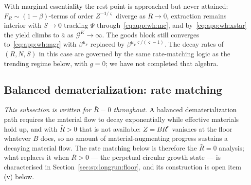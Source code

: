  With marginal essentiality the rest point is approached but never attained: $F_R\sim\left(1-\beta\right)$-terms of order $Z^{-1/\varsigma}$ diverge as $R\to0$, extraction remains interior with $S\to0$ tracking $\Psi$ through~\eqref{eq:app:wh:mc}, and by~\eqref{eq:app:wh:xstar} the yield climbs to $\bar a$ as $\mathcal G^K\to\infty$. The goods block still converges to~\eqref{eq:app:wh:mgr} with $\beta^{\mu_F}$ replaced by $\beta^{\mu_F\varsigma/\left(\varsigma-1\right)}$. The decay rates of $\left(R,N,S\right)$ in this case are governed by the same rate-matching logic as the trending regime below, with $g=0$; we have not completed that algebra.

\subsection{Balanced dematerialization: rate matching}\label{sec:app:workhorse:bdp}

\emph{This subsection is written for $\bar R=0$ throughout.} A balanced dematerialization path requires the material flow to decay exponentially while effective materials hold up, and with $\bar R>0$ that is not available: $Z=BR^e$ vanishes at the floor whatever $B$ does, so no amount of material-augmenting progress sustains a decaying material flow. The rate matching below is therefore the $\bar R=0$ analysis; what replaces it when $\bar R>0$ --- the perpetual circular growth state --- is characterised in Section~\ref{sec:sp:longrun:floor}, and its construction is open item (v) below.

